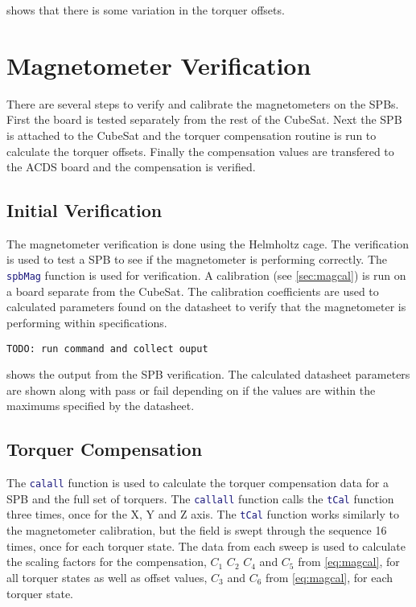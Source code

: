  shows that there is some variation in the torquer offsets. 

\section{Magnetometer Verification}

There are several steps to verify and calibrate the magnetometers on the \acp{SPB}. First the board is tested separately from the rest of the CubeSat. Next the \ac{SPB} is attached to the CubeSat and the torquer compensation routine is run to calculate the torquer offsets. Finally the compensation values are transfered to the \ac{ACDS} board and the compensation is verified.


\subsection{Initial Verification}

The magnetometer verification is done using the Helmholtz cage. The verification is used to test a \ac{SPB} to see if the magnetometer is performing correctly. The \lstinline[style=code,language=Matlab]$spbMag$ function is used for verification. A calibration (see \cref{sec:magcal}) is run on a board separate from the CubeSat. The calibration coefficients are used to calculated parameters found on the datasheet to verify that the magnetometer is performing within specifications.

\begin{lstlisting}[caption={\ac{SPB} verification results},label={lst:vspb-res},language=verbatim]
TODO: run command and collect ouput
\end{lstlisting}

 shows the output from the \ac{SPB} verification. The calculated datasheet parameters are shown along with pass or fail depending on if the values are within the maximums specified by the datasheet.


\subsection{Torquer Compensation}

\label{sec:tst-tq-comp}

The \lstinline[style=code,language=Matlab]$calall$ function is used to calculate the torquer compensation data for a \ac{SPB} and the full set of torquers. The \lstinline[style=code,language=Matlab]$callall$ function calls the \lstinline[style=code,language=Matlab]$tCal$ function three times, once for the X, Y and Z axis. The \lstinline[style=code,language=Matlab]$tCal$ function works similarly to the magnetometer calibration, but the field is swept through the sequence 16 times, once for each torquer state. The data from each sweep is used to calculate the scaling factors for the compensation, $C_1$ $C_2$ $C_4$ and $C_5$ from \cref{eq:magcal}, for all torquer states as well as offset values, $C_3$ and $C_6$ from \cref{eq:magcal}, for each torquer state.

